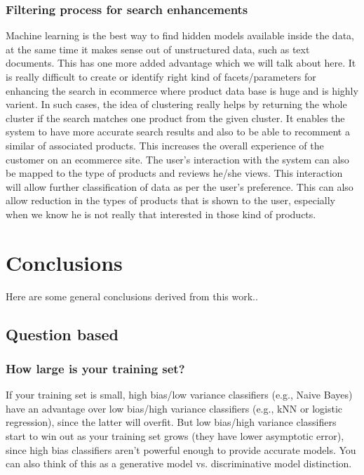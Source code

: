 \documentclass[12pt]{book}
\begin{document}
\subsection{Filtering process for search enhancements}
Machine learning is the best way to find hidden models available inside the data, at the same time it makes sense out of unstructured data, such as text documents. This has one more added advantage which we will talk about here. It is really difficult 
to create or identify right kind of facets/parameters for enhancing the search in ecommerce where product data base is huge and is highly varient. In such cases, the idea of clustering really helps by returning the whole cluster if the search matches one
product from the given cluster. It enables the system to have more accurate search results and also to be able to recomment a similar of associated products. This increases the overall experience of the customer on an ecommerce site. The user's interaction
with the system can also be mapped to the type of products and reviews he/she views. This interaction will allow further classification of data as per the user's preference. This can also allow reduction in the types of products that is shown to the user,
especially when we know he is not really that interested in those kind of products.

\chapter{Conclusions}

Here are some general conclusions derived from this work..

\section{Question based}
\subsection{How large is your training set?}
If your training set is small, high bias/low variance classifiers (e.g., Naive Bayes) have an advantage over low bias/high variance classifiers (e.g., kNN or logistic regression), since the latter will overfit. But low bias/high variance classifiers start to win out as your training set grows (they have lower asymptotic error), since high bias classifiers aren't powerful enough to provide accurate models. 
You can also think of this as a generative model vs. discriminative model distinction.
\end{document}
